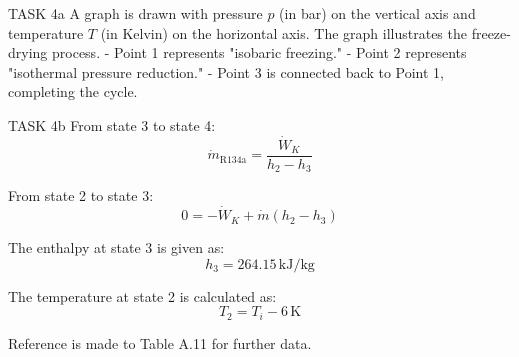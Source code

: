 TASK 4a  
A graph is drawn with pressure \( p \) (in bar) on the vertical axis and temperature \( T \) (in Kelvin) on the horizontal axis. The graph illustrates the freeze-drying process.  
- Point 1 represents "isobaric freezing."  
- Point 2 represents "isothermal pressure reduction."  
- Point 3 is connected back to Point 1, completing the cycle.  

TASK 4b  
From state 3 to state 4:  
\[
\dot{m}_{\text{R134a}} = \frac{\dot{W}_K}{h_2 - h_3}
\]  

From state 2 to state 3:  
\[
0 = -\dot{W}_K + \dot{m} (h_2 - h_3)
\]  

The enthalpy at state 3 is given as:  
\[
h_3 = 264.15 \, \text{kJ/kg}
\]  

The temperature at state 2 is calculated as:  
\[
T_2 = T_i - 6 \, \text{K}
\]  

Reference is made to Table A.11 for further data.